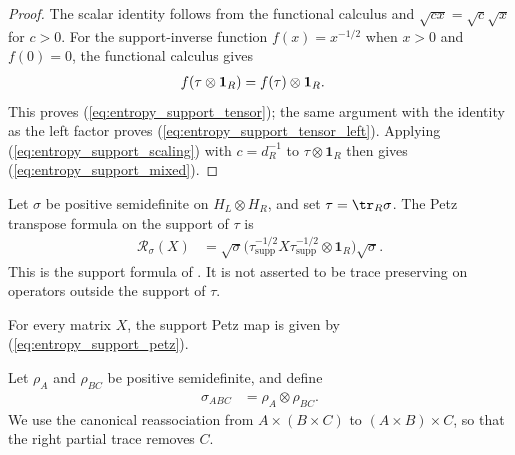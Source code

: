 \begin{proof}\leanok
    The scalar identity follows from the functional calculus and
    $\sqrt{cx}=\sqrt c\sqrt x$ for $c>0$. For the support-inverse function
    $f(x)=x^{-1/2}$ when $x>0$ and $f(0)=0$, the functional calculus gives
    \begin{align}
        f(\tau\otimes\mathbf 1_R)
        &=f(\tau)\otimes\mathbf 1_R.
        \notag
    \end{align}
    This proves (\ref{eq:entropy_support_tensor}); the same argument with the
    identity as the left factor proves
    (\ref{eq:entropy_support_tensor_left}). Applying
    (\ref{eq:entropy_support_scaling}) with $c=d_R^{-1}$ to
    $\tau\otimes\mathbf 1_R$ then gives
    (\ref{eq:entropy_support_mixed}).
\end{proof}

\begin{definition}
    \label{def:partial_trace_support_petz_map}
    \leanok
    Let $\sigma$ be positive semidefinite on $H_L\otimes H_R$, and set
    $\tau=\tr_R\sigma$. The Petz transpose formula on the
    support of $\tau$ is
    \begin{align}
        \mathcal R_\sigma(X)
        &=\sqrt\sigma
          \bigl(\tau^{-1/2}_{\mathrm{supp}}X
          \tau^{-1/2}_{\mathrm{supp}}\otimes\mathbf 1_R\bigr)\sqrt\sigma.
        \label{eq:entropy_support_petz}
    \end{align}
    This is the support formula of
    \cite[Theorem~3, equation~(8)]{Hayden2004Structure}. It is not asserted to
    be trace preserving on operators outside the support of $\tau$.
\end{definition}

\begin{lemma}
    \label{lem:partial_trace_support_petz_map_apply}
    \leanok
    For every matrix $X$, the support Petz map is given by
    (\ref{eq:entropy_support_petz}).
\end{lemma}


\begin{definition}
    \label{def:entropy_product_tensor_reference}
    \leanok
    Let $\rho_A$ and $\rho_{BC}$ be positive semidefinite, and define
    \begin{align}
        \sigma_{ABC}
        &=\rho_A\otimes\rho_{BC}.
        \label{eq:entropy_general_product_reference}
    \end{align}
    We use the canonical reassociation from $A\times(B\times C)$ to
    $(A\times B)\times C$, so that the right partial trace removes $C$.
\end{definition}

